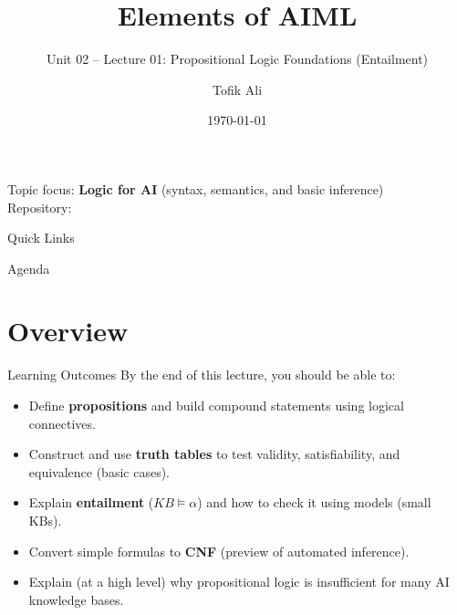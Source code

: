 \documentclass[aspectratio=169]{beamer}
\title[Elements of AIML]{Elements of AIML}
\subtitle{Unit 02 -- Lecture 01: Propositional Logic Foundations (Entailment)}
\author{Tofik Ali}
\institute{School of Computer Science, UPES Dehradun}
\date{\today}
\begin{document}
\UPESCoverFrame
\setcounter{framenumber}{0}

\begin{frame}
  \titlepage
  \vspace{0.3em}
  \begin{center}
    \footnotesize Topic focus: \textbf{Logic for AI} (syntax, semantics, and basic inference)\\[0.25em]
    \footnotesize Repository: \texttt{\AIMLRepoURL}
  \end{center}
  \slidesources{\AIMLUnitIISources}
\end{frame}

\begin{frame}{Quick Links}
  \centering
  \hyperlink{sec:overview}{}\hspace{0.6em}
  \hyperlink{sec:pl}{}\hspace{0.6em}
  \hyperlink{sec:limits}{}\hspace{0.6em}
  \hyperlink{sec:practice}{}\hspace{0.6em}
  \hyperlink{sec:summary}{}
\end{frame}

\begin{frame}{Agenda}
  \tableofcontents
\end{frame}

\section{Overview}
\label{sec:overview}

\begin{frame}{Learning Outcomes}
  By the end of this lecture, you should be able to:
  \begin{itemize}[<+->]
    \item Define \textbf{propositions} and build compound statements using logical connectives.
    \item Construct and use \textbf{truth tables} to test validity, satisfiability, and equivalence (basic cases).
    \item Explain \textbf{entailment} ($KB \models \alpha$) and how to check it using models (small KBs).
    \item Convert simple formulas to \textbf{CNF} (preview of automated inference).
    \item Explain (at a high level) why propositional logic is insufficient for many AI knowledge bases.
  \end{itemize}
\end{frame}
\end{document}

